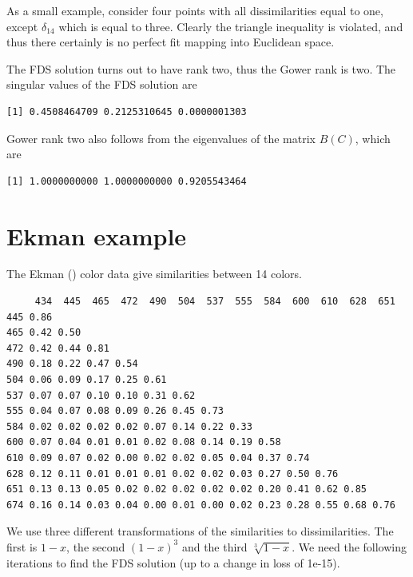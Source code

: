 \documentclass[
  12pt,
  letterpaper,
  DIV=11,
  numbers=noendperiod]{scrreprt}
\theoremstyle{remark}
\begin{document}
As a small example, consider four points with all dissimilarities equal
to one, except \(\delta_{14}\) which is equal to three. Clearly the
triangle inequality is violated, and thus there certainly is no perfect
fit mapping into Euclidean space.

The FDS solution turns out to have rank two, thus the Gower rank is two.
The singular values of the FDS solution are

\begin{verbatim}
[1] 0.4508464709 0.2125310645 0.0000001303
\end{verbatim}

Gower rank two also follows from the eigenvalues of the matrix \(B(C)\),
which are

\begin{verbatim}
[1] 1.0000000000 1.0000000000 0.9205543464
\end{verbatim}

\section{Ekman example}\label{ekman-example-1}

The Ekman () color data give similarities
between 14 colors.

\begin{verbatim}
     434  445  465  472  490  504  537  555  584  600  610  628  651
445 0.86                                                            
465 0.42 0.50                                                       
472 0.42 0.44 0.81                                                  
490 0.18 0.22 0.47 0.54                                             
504 0.06 0.09 0.17 0.25 0.61                                        
537 0.07 0.07 0.10 0.10 0.31 0.62                                   
555 0.04 0.07 0.08 0.09 0.26 0.45 0.73                              
584 0.02 0.02 0.02 0.02 0.07 0.14 0.22 0.33                         
600 0.07 0.04 0.01 0.01 0.02 0.08 0.14 0.19 0.58                    
610 0.09 0.07 0.02 0.00 0.02 0.02 0.05 0.04 0.37 0.74               
628 0.12 0.11 0.01 0.01 0.01 0.02 0.02 0.03 0.27 0.50 0.76          
651 0.13 0.13 0.05 0.02 0.02 0.02 0.02 0.02 0.20 0.41 0.62 0.85     
674 0.16 0.14 0.03 0.04 0.00 0.01 0.00 0.02 0.23 0.28 0.55 0.68 0.76
\end{verbatim}

We use three different transformations of the similarities to
dissimilarities. The first is \(1-x\), the second \((1-x)^3\) and the
third \(\sqrt[3]{1-x}\). We need the following iterations to find the
FDS solution (up to a change in loss of 1e-15).
\end{document}
